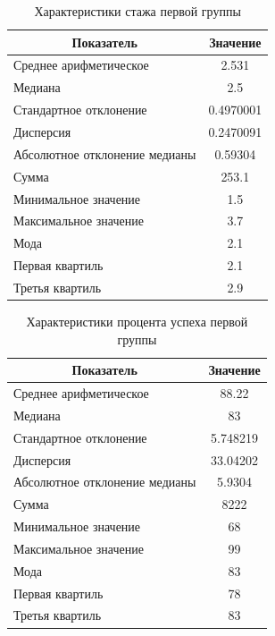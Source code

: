 \begin{table}[H]
	\centering
	\caption{Характеристики стажа первой группы}
	\begin{tabular}{|l|c|}
		\hline
		\multicolumn{1}{|c|}{\textbf{Показатель}} & \textbf{Значение}\\ \hline
		Среднее арифметическое        & 2.531     \\ \hline
		Медиана                       & 2.5       \\ \hline
		Стандартное отклонение        & 0.4970001 \\ \hline
		Дисперсия                      & 0.2470091 \\ \hline
		Абсолютное отклонение медианы & 0.59304   \\ \hline
		Сумма                         & 253.1     \\ \hline
		Минимальное значение          & 1.5       \\ \hline
		Максимальное значение         & 3.7       \\ \hline
		Мода & 2.1 \\ \hline
		Первая квартиль & 2.1 \\ \hline
		Третья квартиль & 2.9 \\ \hline
	\end{tabular}
\end{table}


\begin{table}[H]
	\centering
	\caption{Характеристики процента успеха первой группы}
	\begin{tabular}{|l|c|}
		\hline
		\multicolumn{1}{|c|}{\textbf{Показатель}} & \textbf{Значение}\\ \hline
		Среднее арифметическое        & 88.22    \\ \hline
		Медиана                       & 83       \\ \hline
		Стандартное отклонение        & 5.748219 \\ \hline
		Дисперсия                      & 33.04202 \\ \hline
		Абсолютное отклонение медианы & 5.9304   \\ \hline
		Сумма                         & 8222     \\ \hline
		Минимальное значение          & 68       \\ \hline
		Максимальное значение         & 99       \\ \hline
		Мода & 83 \\ \hline
		Первая квартиль & 78 \\ \hline
		Третья квартиль & 83 \\ \hline
	\end{tabular}
\end{table}


